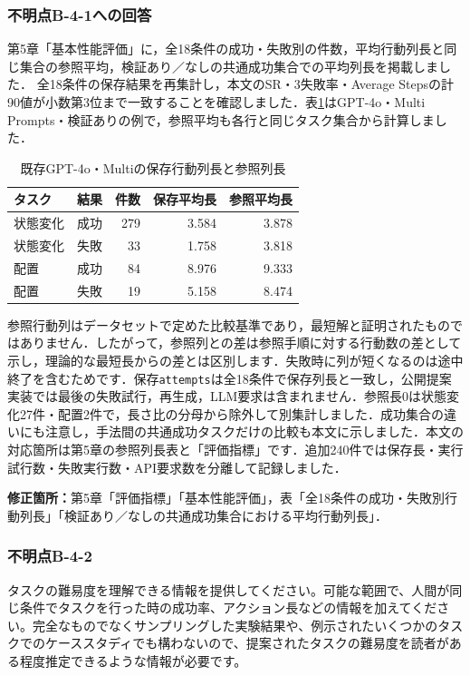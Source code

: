\documentclass{jsarticle}
\begin{document}
\subsubsection*{不明点B-4-1への回答}
第5章「基本性能評価」に，全18条件の成功・失敗別の件数，平均行動列長と同じ集合の参照平均，検証あり／なしの共通成功集合での平均列長を掲載しました．
全18条件の保存結果を再集計し，本文のSR・3失敗率・Average Stepsの計90値が小数第3位まで一致することを確認しました．表\ref{tab:reply_lengths}はGPT-4o・Multi Prompts・検証ありの例で，参照平均も各行と同じタスク集合から計算しました．

\begin{table}[htbp]
\centering\small
\caption{既存GPT-4o・Multiの保存行動列長と参照列長}\label{tab:reply_lengths}
\begin{tabular}{llrrr}
\hline
タスク & 結果 & 件数 & 保存平均長 & 参照平均長 \\
\hline
状態変化 & 成功 & 279 & 3.584 & 3.878 \\
状態変化 & 失敗 & 33 & 1.758 & 3.818 \\
配置 & 成功 & 84 & 8.976 & 9.333 \\
配置 & 失敗 & 19 & 5.158 & 8.474 \\
\hline
\end{tabular}
\end{table}

参照行動列はデータセットで定めた比較基準であり，最短解と証明されたものではありません．したがって，参照列との差は参照手順に対する行動数の差として示し，理論的な最短長からの差とは区別します．失敗時に列が短くなるのは途中終了を含むためです．保存\texttt{attempts}は全18条件で保存列長と一致し，公開提案実装では最後の失敗試行，再生成，LLM要求は含まれません．参照長0は状態変化27件・配置2件で，長さ比の分母から除外して別集計しました．成功集合の違いにも注意し，手法間の共通成功タスクだけの比較も本文に示しました．本文の対応箇所は第5章の参照列長表と「評価指標」です．追加240件では保存長・実行試行数・失敗実行数・API要求数を分離して記録しました．

\noindent\textbf{修正箇所：}第5章「評価指標」「基本性能評価」，表「全18条件の成功・失敗別行動列長」「検証あり／なしの共通成功集合における平均行動列長」．


\subsubsection*{不明点B-4-2}
\begin{screen}
タスクの難易度を理解できる情報を提供してください。可能な範囲で、人間が同じ条件でタスクを行った時の成功率、アクション長などの情報を加えてください。完全なものでなくサンプリングした実験結果や、例示されたいくつかのタスクでのケーススタディでも構わないので、提案されたタスクの難易度を読者がある程度推定できるような情報が必要です。
\end{screen}
\end{document}
